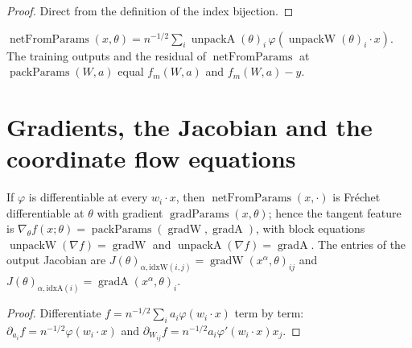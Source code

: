 \begin{proof}
  \leanok
Direct from the definition of the index bijection.
\end{proof}

\begin{lemma}\label{lem:ntktl:netProps}
  \leanok
$\operatorname{netFromParams}(x,\theta)=n^{-1/2}\sum_i\operatorname{unpackA}(\theta)_i\,\varphi(\operatorname{unpackW}(\theta)_i\cdot x)$. The training outputs and the residual of $\operatorname{netFromParams}$ at $\operatorname{packParams}(W,a)$ equal
$f_m(W,a)$ and $f_m(W,a)-y$.
\end{lemma}


\section{Gradients, the Jacobian and the coordinate flow equations}\label{sec:ntktl:gradients}

\begin{theorem}\label{thm:ntktl:gradient}
  \leanok
If $\varphi$ is differentiable at every $w_i\cdot x$, then $\operatorname{netFromParams}(x,\cdot)$ is Fr\'echet differentiable at $\theta$ with gradient $\operatorname{gradParams}(x,\theta)$; hence the tangent feature is
$\nabla_\theta f(x;\theta)=\operatorname{packParams}(\operatorname{gradW},\operatorname{gradA})$, with block equations $\operatorname{unpackW}(\nabla f)=\operatorname{gradW}$ and $\operatorname{unpackA}(\nabla f)=\operatorname{gradA}$. The entries of the output Jacobian are
$J(\theta)_{\alpha,\mathrm{idxW}(i,j)}=\operatorname{gradW}(x^\alpha,\theta)_{ij}$ and $J(\theta)_{\alpha,\mathrm{idxA}(i)}=\operatorname{gradA}(x^\alpha,\theta)_i$.
\end{theorem}

\begin{proof}
  \leanok
Differentiate $f=n^{-1/2}\sum_ia_i\varphi(w_i\cdot x)$ term by term: $\partial_{a_i}f=n^{-1/2}\varphi(w_i\cdot x)$ and $\partial_{W_{ij}}f=n^{-1/2}a_i\varphi'(w_i\cdot x)x_j$.
\end{proof}

